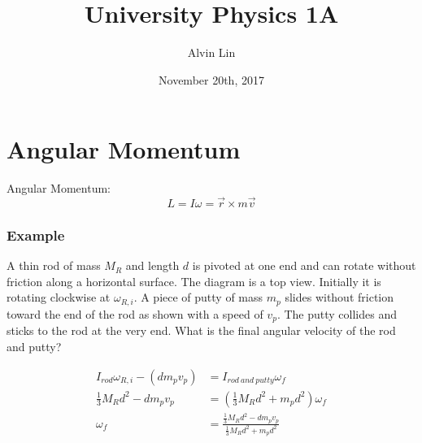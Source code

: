 \documentclass{math}
\title{University Physics 1A}
\author{Alvin Lin}
\date{November 20th, 2017}
\begin{document}
\maketitle

\section*{Angular Momentum}
Angular Momentum:
\[ L = I\omega = \vec{r}\times m\vec{v} \]

\subsubsection*{Example}
A thin rod of mass \( M_R \) and length \( d \) is pivoted at one end and can
rotate without friction along a horizontal surface. The diagram is a top view.
Initially it is rotating clockwise at \( \omega_{R,i} \). A piece of putty of
mass \( m_p \) slides without friction toward the end of the rod as shown with
a speed of \( v_p \). The putty collides and sticks to the rod at the very end.
What is the final angular velocity of the rod and putty?
\begin{center}
\end{center}
\begin{align*}
  I_{rod}\omega_{R,i}-(dm_pv_p) &= I_{rod~and~putty}\omega_f \\
  \frac{1}{3}M_Rd^2-dm_pv_p &= (\frac{1}{3}M_Rd^2+m_pd^2)\omega_f \\
  \omega_f &= \frac{\frac{1}{3}M_Rd^2-dm_pv_p}{\frac{1}{3}M_Rd^2+m_pd^2}
\end{align*}
\end{document}
